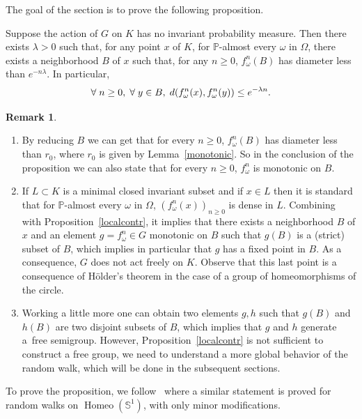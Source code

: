 \documentclass[10pt]{amsart}
\theoremstyle{definition}\newtheorem{defi}[theo]{Definition}\newtheorem{rema}[theo]{Remark}\newtheorem{exam}[theo]{Example}\newtheorem{exem}[theo]{Example}\newtheorem{nota}[theo]{Notation}
\DeclareMathOperator{\Homeo}{Homeo}
\newcommand{\bbP}{\mathbb{P}}
\newcommand{\bbS}{\mathbb{S}}
\newcounter{setofcase}
\newcounter{case}[setofcase]
\let\originalleft\left
\let\originalright\right
\renewcommand{\left}{\mathopen{}\mathclose\bgroup\originalleft}
\renewcommand{\right}{\aftergroup\egroup\originalright}
\let\oldforall\forall
\renewcommand*{\forall}{\mathrel{\oldforall}}
\begin{document}
The goal of the section is to prove the following proposition.

\begin{prop}\label{localcontr}
Suppose the action of $G$ on $K$ has no invariant probability measure. Then there exists $\lambda>0$ such that, for any point $x$ of $K$, for $\bbP$-almost every $\omega$ in $\Omega$, there exists a neighborhood $B$ of $x$ such that, for any $n\geq 0$, $f_\omega^n(B)$ has diameter less than $e^{-n\lambda}$. In particular,
\[
\forall n \geq 0,\;\forall y\in B,\; d\left(f_\omega^n(x),f_\omega^n(y)\right) \leq e^{-\lambda n}.
\]
\end{prop}

\begin{rema}\label{rema3.2}
\leavevmode
\begin{enumerate}
\item\label{rema3.2.1} By reducing $B$ we can get that for every $n\ge 0$, $f_\omega^n(B)$ has diameter less than $r_0$, where $r_0$ is given by Lemma~\ref{monotonic}. So in the conclusion of the proposition we can also state that for every $n\ge 0$, $f_\omega^n$ is monotonic on $B$.
\item\label{rema3.2.2} If $L\subset K$ is a minimal closed invariant subset and if $x\in L$ then it is standard that for $\bbP$-almost every $\omega$ in $\Omega$, $(f_\omega^n(x))_{n \geq 0}$ is dense in $L$. Combining with Proposition~\ref{localcontr}, it implies that there exists a neighborhood $B$ of $x$ and an element $g=f_\omega^n\in G$ monotonic on $B$ such that $g(B)$ is a (strict) subset of $B$, which implies in particular that $g$ has a fixed point in $B$. As a consequence, $G$ does not act freely on $K$. Observe that this last point is a consequence of H\"older's theorem in the case of a group of homeomorphisms of the circle.
\item\label{rema3.2.3} Working a little more one can obtain two elements $g,h$ such that $g(B)$ and $h(B)$ are two disjoint subsets of $B$, which implies that $g$ and $h$ generate a~free semigroup. However, Proposition~\ref{localcontr} is not sufficient to construct a free group, we need to understand a more global behavior of the random walk, which will be done in the subsequent sections.
\end{enumerate}
\end{rema}


To prove the proposition, we follow~\cite{Mal} where a similar statement is proved for random walks on $\Homeo(\bbS^1)$, with only minor modifications.
\end{document}
